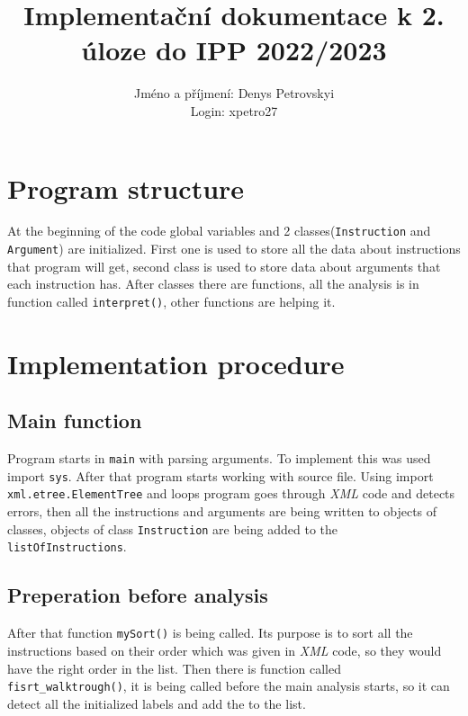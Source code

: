 \documentclass[11pt, a4paper]{article}
\title{Implementační dokumentace k 2. úloze do IPP 2022/2023}
\author{Jméno a příjmení: Denys Petrovskyi\\ Login: xpetro27}
\date{}
\begin{document}
\maketitle
\section{Program structure}
At the beginning of the code global variables and 2 classes(\verb|Instruction| and \verb|Argument|) are initialized. First
one is used to store all the data about instructions that program will get, second class is used to store data about 
arguments that each instruction has. After classes there are functions, all the analysis is in function called 
\verb|interpret()|, other functions are helping it.
\section{Implementation procedure} 
\subsection{Main function}
Program starts in \verb|main| with parsing arguments. To implement this was used import \verb|sys|. After that program starts working 
with source file. Using import \verb|xml.etree.ElementTree| and loops program goes through \emph{XML} code and detects errors,
then all the instructions and arguments are being written to objects of classes, objects of class \verb|Instruction|
are being added to the \verb|listOfInstructions|.
\subsection{Preperation before analysis}
After that function \verb|mySort()| is being called. Its purpose is to sort all the instructions based on their order
which was given in \emph{XML} code, so they would have the right order in the list.
Then there is function called \verb|fisrt_walktrough()|, it is being called before the main analysis starts,
so it can detect all the initialized labels and add the to the list.
\end{document}
